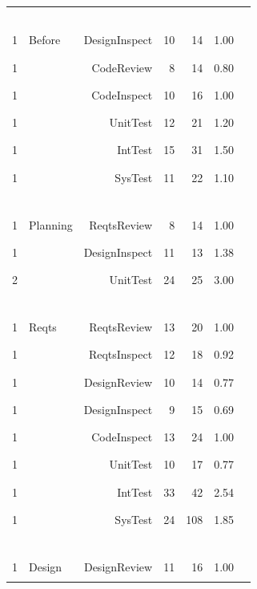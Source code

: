 \documentclass[smallcondensed]{svjour3}
\begin{document}
\begin{figure}
\begin{center}
\begin{tabular}{c|lr|rr|rl}
\multicolumn{7}{c}{~}  \\
1 &  Before   
      &   DesignInspect   & 10 &  14 & 1.00 & \textcolor{black}{\rule{10mm}{2mm}}  \\
1 &   &   CodeReview      & 8 &  14 & 0.80 & \textcolor{black}{\rule{8mm}{2mm}}  \\
1 &   &   CodeInspect     & 10 &  16 & 1.00 & \textcolor{black}{\rule{10mm}{2mm}}  \\
1 &   &   UnitTest        & 12 &   21 & 1.20 & \textcolor{black}{\rule{12mm}{2mm}}  \\
1 &   &   IntTest         & 15 &   31 & 1.50 & \textcolor{black}{\rule{15mm}{2mm}}  \\
1 &   &   SysTest         & 11 &   22 & 1.10 & \textcolor{black}{\rule{12mm}{2mm}}  \\  
\hline\multicolumn{7}{c}{~}  \\
1 &  Planning     &   ReqtsReview     & 8 &  14 & 1.00 & \textcolor{black}{\rule{10mm}{2mm}}  \\
1 &               &   DesignInspect   & 11 &  13 & 1.38 & \textcolor{black}{\rule{13mm}{2mm}} \\
2 &               &   UnitTest        & 24 &   25 & 3.00 & \textcolor{black}{\rule{30mm}{2mm}} \\
\hline\multicolumn{7}{c}{~}  \\
1 &  Reqts   &   ReqtsReview     & 13 &  20 & 1.00 & \textcolor{black}{\rule{10mm}{2mm}} \\
1 &          &   ReqtsInspect    & 12 &   18 & 0.92 & \textcolor{black}{\rule{9mm}{2mm}}  \\
1 &          &   DesignReview    & 10 &   14 & 0.77 & \textcolor{black}{\rule{7mm}{2mm}} \\
1 &          &   DesignInspect   & 9 &   15 & 0.69 & \textcolor{black}{\rule{6mm}{2mm}}   \\
1 &          &   CodeInspect     & 13 &  24 & 1.00 & \textcolor{black}{\rule{10mm}{2mm}} \\
1 &          &   UnitTest        & 10 &  17 & 0.77 & \textcolor{black}{\rule{7mm}{2mm}}  \\
1 &          &   IntTest         & 33 &   42 & 2.54 & \textcolor{black}{\rule{25mm}{2mm}}  \\
1 &          &   SysTest         & 24 &  108 & 1.85 & \textcolor{black}{\rule{18mm}{2mm}}  \\
\hline\multicolumn{7}{c}{~}  \\
1 & Design   &   DesignReview    & 11 &   16 & 1.00 & \textcolor{black}{\rule{10mm}{2mm}}  \\

\end{tabular}
\end{center}
\end{figure}
\end{document}
